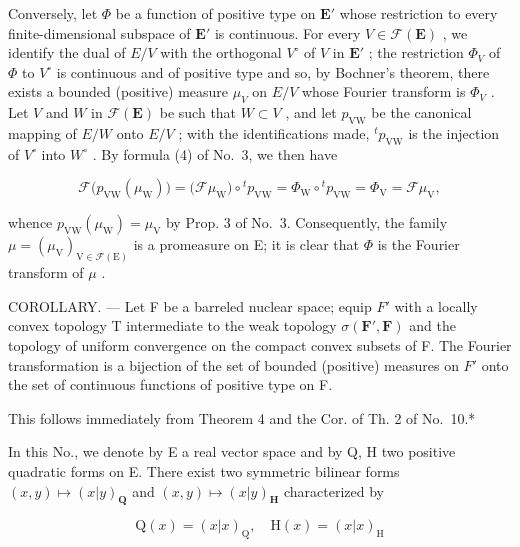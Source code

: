 Conversely, let \(\Phi\) be a function of positive type on \(\mathbf{E}'\) whose restriction to every finite-dimensional subspace of \(\mathbf{E}'\) is continuous. For every \(V \in \mathcal{F}(\mathbf{E})\) , we identify the dual of \(E/V\) with the orthogonal \(V^{\circ}\) of \(V\) in \(\mathbf{E}'\) ; the restriction \(\Phi_V\) of \(\Phi\) to \(V^{\circ}\) is continuous and of positive type and so, by Bochner's theorem, there exists a bounded (positive) measure \(\mu_V\) on \(E/V\) whose Fourier transform is \(\Phi_V\) . Let \(V\) and \(W\) in \(\mathcal{F}(\mathbf{E})\) be such that \(W \subset V\) , and let \(p_{\mathrm{VW}}\) be the canonical mapping of \(E/W\) onto \(E/V\) ; with the identifications made, \(^{t}p_{\mathrm{VW}}\) is the injection of \(V^{\circ}\) into \(W^{\circ}\) . By formula (4) of No.~3, we then have

\[
\mathcal {F} \big (p _ {\mathrm{VW}} (\mu_ {\mathrm{W}}) \big) = \big (\mathcal {F} \mu_ {\mathrm{W}} \big) \circ {} ^ {t} p _ {\mathrm{VW}} = \Phi_ {\mathrm{W}} \circ {} ^ {t} p _ {\mathrm{VW}} = \Phi_ {\mathrm{V}} = \mathcal {F} \mu_ {\mathrm{V}},
\]

whence \(p_{\mathrm{VW}}(\mu_{\mathrm{W}}) = \mu_{\mathrm{V}}\) by Prop. 3 of No.~3. Consequently, the family \(\mu = (\mu_{\mathrm{V}})_{\mathrm{V} \in \mathcal{F}(\mathrm{E})}\) is a promeasure on E; it is clear that \(\Phi\) is the Fourier transform of \(\mu\) .

COROLLARY. --- Let F be a barreled nuclear space; equip \(F'\) with a locally convex topology T intermediate to the weak topology \(\sigma(\mathbf{F}',\mathbf{F})\) and the topology of uniform convergence on the compact convex subsets of F. The Fourier transformation is a bijection of the set of bounded (positive) measures on \(F'\) onto the set of continuous functions of positive type on F.

This follows immediately from Theorem 4 and the Cor. of Th. 2 of No.~10.*



In this No., we denote by E a real vector space and by Q, H two positive quadratic forms on E. There exist two symmetric bilinear forms \((x,y)\mapsto(x|y)_{\mathbf{Q}}\) and \((x,y)\mapsto(x|y)_{\mathbf{H}}\) characterized by

\[
\mathrm{Q} (x) = (x | x) _ {\mathrm{Q}}, \quad \mathrm{H} (x) = (x | x) _ {\mathrm{H}}
\]

